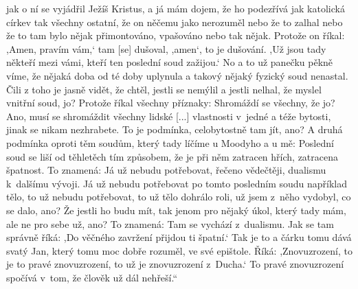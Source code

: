 {jak o ní se vyjádřil Ježíš Kristus, a já mám dojem, že ho podezřívá jak
katolická církev tak všechny ostatní, že on něčemu jako nerozuměl nebo že to
zalhal nebo že to tam bylo nějak přimontováno, vpašováno nebo tak nějak. Protože
on říkal: ,Amen, pravím vám,` tam [se] dušoval, ,amen`, to je dušování. ,Už jsou
tady někteří mezi vámi, kteří ten poslední soud zažijou.` No a to už panečku
pěkně víme, že nějaká doba od té doby uplynula a takový nějaký fyzický soud
nenastal. Čili z toho je jasně vidět, že chtěl, jestli se nemýlil a jestli
nelhal, že myslel vnitřní soud, jo? Protože říkal všechny příznaky: Shromáždí se
všechny, že jo? Ano, musí se shromáždit všechny lidské [...]
vlastnosti v~jedné a téže bytosti, jinak se nikam nezhrabete. To
je podmínka, celobytostně tam jít, ano? A druhá podmínka oproti těm soudům,
který tady líčíme u Moodyho a u mě: Poslední soud se liší od těhletěch tím
způsobem, že je při něm zatracen hřích, zatracena špatnost. To znamená: Já už
nebudu potřebovat, řečeno vědečtěji, dualismu k~dalšímu vývoji. Já už nebudu
potřebovat po tomto posledním soudu například tělo, to už nebudu potřebovat, to
už tělo dohrálo roli, už jsem z~něho vydobyl, co se dalo, ano? Že jestli ho budu
mít, tak jenom pro nějaký úkol, který tady mám, ale ne pro sebe už, ano? To
znamená: Tam se vychází z~dualismu. Jak se tam správně říká: ,Do věčného
zavržení přijdou ti špatní.` Tak je to a čárku tomu dává svatý Jan, který tomu
moc dobře rozuměl, ve své epištole. Říká: ,Znovuzrození, to je to pravé
znovuzrození, to už je znovuzrození z~Ducha.` To pravé znovuzrození spočívá
v~tom, že člověk už dál nehřeší.``
}

